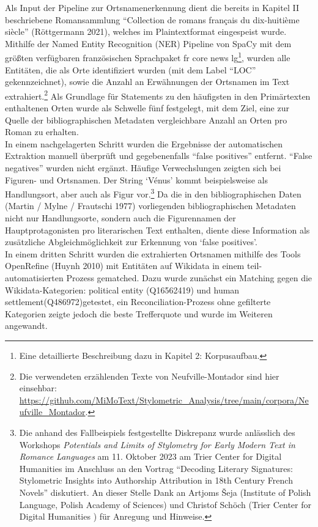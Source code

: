 \documentclass[
  12pt,
  letterpaper,
  DIV=11,
  numbers=noendperiod]{scrreprt}
\begin{document}
Als Input der Pipeline zur Ortsnamenerkennung dient die bereits in
Kapitel II beschriebene Romansammlung ``Collection de romans français du
dix-huitième siècle'' (Röttgermann 2021), welches im Plaintextformat
eingespeist wurde. Mithilfe der Named Entity Recognition (NER) Pipeline
von SpaCy mit dem größten verfügbaren französischen Sprachpaket fr core
news lg\footnote{Eine detaillierte Beschreibung dazu in Kapitel 2:
  Korpusaufbau.}, wurden alle Entitäten, die als Orte identifiziert
wurden (mit dem Label ``LOC'' gekennzeichnet), sowie die Anzahl an
Erwähnungen der Ortsnamen im Text extrahiert.\footnote{Die verwendeten
  erzählenden Texte von Neufville-Montador sind hier einsehbar:
  \url{https://github.com/MiMoText/Stylometric_Analysis/tree/main/corpora/Neufville_Montador}.}
Als Grundlage für Statements zu den häufigsten in den Primärtexten
enthaltenen Orten wurde als Schwelle fünf festgelegt, mit dem Ziel, eine
zur Quelle der bibliographischen Metadaten vergleichbare Anzahl an Orten
pro Roman zu erhalten.\\
In einem nachgelagerten Schritt wurden die Ergebnisse der automatischen
Extraktion manuell überprüft und gegebenenfalls ``false positives''
entfernt. ``False negatives'' wurden nicht ergänzt. Häufige
Verwechslungen zeigten sich bei Figuren- und Ortsnamen. Der String
`Vénus' kommt beispielsweise als Handlungsort, aber auch als Figur
vor.\footnote{Die anhand des Fallbeispiels festgestellte Diskrepanz
  wurde anlässlich des Workshops \emph{Potentials and Limits of
  Stylometry for Early Modern Text in Romance Languages} am 11. Oktober
  2023 am Trier Center for Digital Humanities im Anschluss an den
  Vortrag ``Decoding Literary Signatures: Stylometric Insights into
  Authorship Attribution in 18th Century French Novels'' diskutiert. An
  dieser Stelle Dank an Artjoms Šeja (Institute of Polish Language,
  Polish Academy of Sciences) und Christof Schöch (Trier Center for
  Digital Humanities ) für Anregung und Hinweise.} Da die in den
bibliographischen Daten (Martin / Mylne / Frautschi 1977) vorliegenden
bibliographischen Metadaten nicht nur Handlungsorte, sondern auch die
Figurennamen der Hauptprotagonisten pro literarischen Text enthalten,
diente diese Information als zusätzliche Abgleichmöglichkeit zur
Erkennung von `false positives'.\\
In einem dritten Schritt wurden die extrahierten Ortsnamen mithilfe des
Tools OpenRefine (Huynh 2010) mit Entitäten auf Wikidata in einem
teil-automatisierten Prozess gematched. Dazu wurde zunächst ein Matching
gegen die Wikidata-Kategorien: political entity (Q16562419) und human
settlement(Q486972)getestet, ein Reconciliation-Prozess ohne gefilterte
Kategorien zeigte jedoch die beste Trefferquote und wurde im Weiteren
angewandt.
\end{document}
